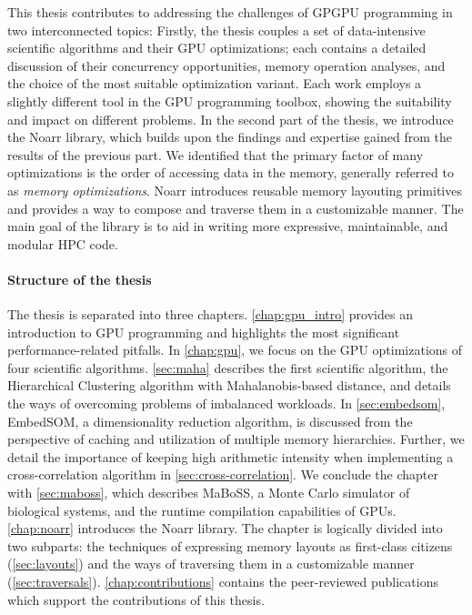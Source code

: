 This thesis contributes to addressing the challenges of GPGPU programming in two interconnected topics:
Firstly, the thesis couples a set of data-intensive scientific algorithms and their GPU optimizations; each contains a detailed discussion of their concurrency opportunities, memory operation analyses, and the choice of the most suitable optimization variant. Each work employs a slightly different tool in the GPU programming toolbox, showing the suitability and impact on different problems.
In the second part of the thesis, we introduce the Noarr library, which builds upon the findings and expertise gained from the results of the previous part. We identified that the primary factor of many optimizations is the order of accessing data in the memory, generally referred to as \emph{memory optimizations}.
Noarr introduces reusable memory layouting primitives and provides a way to compose and traverse them in a customizable manner. The main goal of the library is to aid in writing more expressive, maintainable, and modular HPC code.

\paragraph{Structure of the thesis}

The thesis is separated into three chapters. \cref{chap:gpu_intro} provides an introduction to GPU programming and highlights the most significant performance-related pitfalls. In \cref{chap:gpu}, we focus on the GPU optimizations of four scientific algorithms. \cref{sec:maha} describes the first scientific algorithm, the Hierarchical Clustering algorithm with Mahalanobis-based distance, and details the ways of overcoming problems of imbalanced workloads. In \cref{sec:embedsom}, EmbedSOM, a dimensionality reduction algorithm, is discussed from the perspective of caching and utilization of multiple memory hierarchies. Further, we detail the importance of keeping high arithmetic intensity when implementing a cross-correlation algorithm in \cref{sec:cross-correlation}. We conclude the chapter with \cref{sec:maboss}, which describes MaBoSS, a Monte Carlo simulator of biological systems, and the runtime compilation capabilities of GPUs. \cref{chap:noarr} introduces the Noarr library. The chapter is logically divided into two subparts: the techniques of expressing memory layouts as first-class citizens (\cref{sec:layouts}) and the ways of traversing them in a customizable manner (\cref{sec:traversals}). \cref{chap:contributions} contains the peer-reviewed publications which support the contributions of this thesis.
